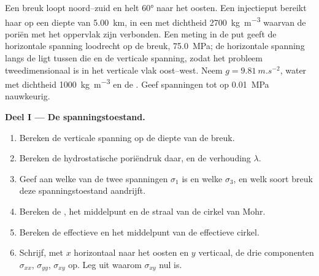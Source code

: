 \begin{problem}
\label{pb:b1:stress-strain-rheology:1}
Een breuk loopt noord--zuid en helt \ang{60} naar het oosten. Een injectieput bereikt haar op een diepte van \qty{5.00}{km}, in een  met dichtheid \qty{2700}{kg.m^{-3}} waarvan de poriën met het oppervlak zijn verbonden. Een meting in de put geeft de horizontale spanning loodrecht op de breuk, \qty{75.0}{MPa}; de horizontale spanning langs de  ligt tussen die en de verticale spanning, zodat het probleem tweedimensionaal is in het verticale vlak oost--west. Neem $g = \qty{9.81}{m.s^{-2}}$, water met dichtheid \qty{1000}{kg.m^{-3}} en de . Geef spanningen tot op \qty{0.01}{MPa} nauwkeurig.

\medskip
\noindent\textbf{Deel I --- De spanningstoestand.}
\begin{enumerate}
  \item Bereken de verticale spanning op de diepte van de breuk.
  \item Bereken de hydrostatische poriëndruk daar, en de verhouding $\lambda$.
  \item Geef aan welke van de twee spanningen $\sigma_1$ is en welke $\sigma_3$, en welk soort breuk deze spanningstoestand aandrijft.
  \item Bereken de , het middelpunt en de straal van de cirkel van Mohr.
  \item Bereken de effectieve  en het middelpunt van de effectieve cirkel.
  \item Schrijf, met $x$ horizontaal naar het oosten en $y$ verticaal, de drie componenten $\sigma_{xx}$, $\sigma_{yy}$, $\sigma_{xy}$ op. Leg uit waarom $\sigma_{xy}$ nul is.
\end{enumerate}


\end{problem}
